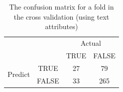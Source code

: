  \begin{table}[]
	\centering
	\caption{The confusion matrix for a fold in the cross validation (using text attributes)}
	\label{confusion2}
	\begin{tabular}{|c|c|c|c|}
		\hline
		\multicolumn{2}{|c|}{\multirow{2}{*}{}}                & \multicolumn{2}{c|}{Actual}                            \\ \cline{3-4} 
		\multicolumn{2}{|c|}{}                                 & \multicolumn{1}{c|}{TRUE} & \multicolumn{1}{c|}{FALSE} \\ \hline
		\multicolumn{1}{|c|}{\multirow{2}{*}{Predict}} & TRUE  & 27                         & 79                          \\ \cline{2-4} 
		\multicolumn{1}{|c|}{}                         & FALSE & 33                        & 265                        \\ \hline
	\end{tabular}
\end{table} 
